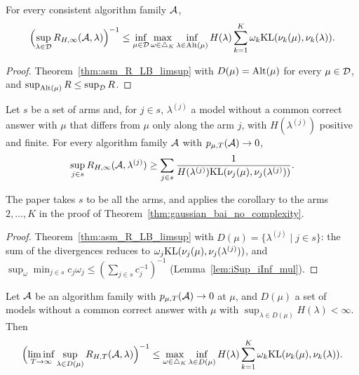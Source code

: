 \begin{theorem}[{\cite[Theorem 3]{D23}}]
  \label{thm:asm_R_LB_limsup_all}
  \leanok
  For every consistent algorithm family $\mathcal{A}$,
  \[ \Bigl(\sup_{\lambda \in \mathcal{D}} R_{H,\infty}(\mathcal{A}, \lambda)\Bigr)^{-1}
    \le \inf_{\mu \in \mathcal{D}} \max_{\omega \in \triangle_K} \inf_{\lambda \in \mathrm{Alt}(\mu)} H(\lambda)
    \sum_{k=1}^K \omega_k \mathrm{KL}(\nu_k(\mu), \nu_k(\lambda)). \]
\end{theorem}

\begin{proof}
  \leanok
  Theorem~\ref{thm:asm_R_LB_limsup} with $D(\mu) = \mathrm{Alt}(\mu)$ for every $\mu \in \mathcal{D}$, and
  $\sup_{\mathrm{Alt}(\mu)} R \le \sup_{\mathcal{D}} R$.
\end{proof}

\begin{corollary}[{\cite[Corollary 4]{D23}}]
  \label{cor:corner_lb}
  \leanok
  Let $s$ be a set of arms and, for $j \in s$, $\lambda^{(j)}$ a model without a common correct
  answer with $\mu$ that differs from $\mu$ only along the arm $j$, with $H(\lambda^{(j)})$
  positive and finite. For every algorithm family $\mathcal{A}$ with $p_{\mu,T}(\mathcal{A}) \to 0$,
  \[ \sup_{j \in s} R_{H,\infty}(\mathcal{A}, \lambda^{(j)}) \ge \sum_{j \in s}
    \frac{1}{H(\lambda^{(j)}) \mathrm{KL}(\nu_j(\mu), \nu_j(\lambda^{(j)}))}. \]
\end{corollary}

The paper takes $s$ to be all the arms, and applies the corollary to the arms $2, \dots, K$ in the
proof of Theorem~\ref{thm:gaussian_bai_no_complexity}.

\begin{proof}
  \leanok
  Theorem~\ref{thm:asm_R_LB_limsup} with $D(\mu) = \{\lambda^{(j)} \mid j \in s\}$: the sum of
  the divergences reduces to $\omega_j \mathrm{KL}(\nu_j(\mu), \nu_j(\lambda^{(j)}))$, and
  $\sup_{\omega} \min_{j \in s} c_j \omega_j \le (\sum_{j \in s} c_j^{-1})^{-1}$
  (Lemma~\ref{lem:iSup_iInf_mul}).
\end{proof}

\begin{theorem}[{\cite[Theorem 13]{D23}}]
  \label{thm:asm_R_LB}
  \leanok
  Let $\mathcal{A}$ be an algorithm family with $p_{\mu,T}(\mathcal{A}) \to 0$ at $\mu$, and $D(\mu)$ a set of
  models without a common correct answer with $\mu$ with $\sup_{\lambda \in D(\mu)} H(\lambda) <
  \infty$. Then
  \[ \Bigl(\liminf_{T \to \infty} \sup_{\lambda \in D(\mu)} R_{H,T}(\mathcal{A}, \lambda)\Bigr)^{-1}
    \le \max_{\omega \in \triangle_K} \inf_{\lambda \in D(\mu)} H(\lambda) \sum_{k=1}^K \omega_k
    \mathrm{KL}(\nu_k(\mu), \nu_k(\lambda)). \]
\end{theorem}

